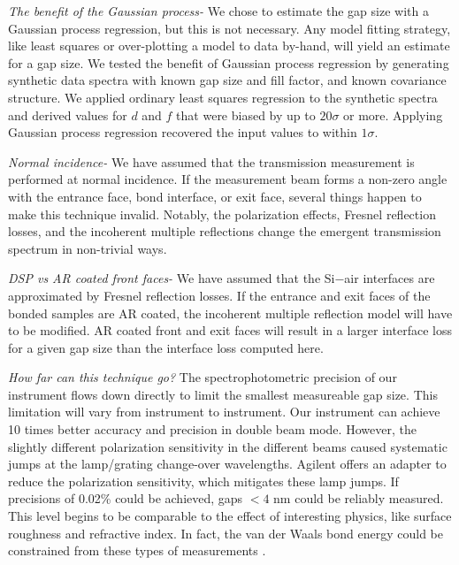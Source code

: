 \emph{The benefit of the Gaussian process-} We chose to estimate the gap size with a Gaussian process regression, but this is not necessary.  Any model fitting strategy, like least squares or over-plotting a model to data by-hand, will yield an estimate for a gap size.  We tested the benefit of Gaussian process regression by generating synthetic data spectra with known gap size and fill factor, and known covariance structure.  We applied ordinary least squares regression to the synthetic spectra and derived values for $d$ and $f$ that were biased by up to $20\sigma$ or more.  Applying Gaussian process regression recovered the input values to within $1\sigma$.

\emph{Normal incidence- } We have assumed that the transmission measurement is performed at normal incidence.  If the measurement beam forms a non-zero angle with the entrance face, bond interface, or exit face, several things happen to make this technique invalid.  Notably, the polarization effects, Fresnel reflection losses, and the incoherent multiple reflections change the emergent transmission spectrum in non-trivial ways.

\emph{DSP vs AR coated front faces- } We have assumed that the Si$-$air interfaces are approximated by Fresnel reflection losses.  If the entrance and exit faces of the bonded samples are AR coated, the incoherent multiple reflection model will have to be modified.  AR coated front and exit faces will result in a larger interface loss for a given gap size than the interface loss computed here.

\emph{How far can this technique go?}  The spectrophotometric precision of our instrument flows down directly to limit the smallest measureable gap size.  This limitation will vary from instrument to instrument.  Our instrument can achieve 10 times better accuracy and precision in double beam mode.  However, the slightly different polarization sensitivity in the different beams caused systematic jumps at the lamp/grating change-over wavelengths.  Agilent offers an adapter to reduce the polarization sensitivity, which mitigates these lamp jumps.  If precisions of 0.02\% could be achieved, gaps $<4$ nm could be reliably measured.  This level begins to be comparable to the effect of interesting physics, like surface roughness and refractive index.  In fact, the van der Waals bond energy could be constrained from these types of measurements \cite{2001JOptA...3...85G}.

